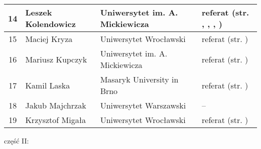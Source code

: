 \documentclass[12pt,oneside]{book}
\begin{document}
\begin{tabular}{||c|l|l|l||}
 14	 & Leszek Kolendowicz & Uniwersytet im. A. Mickiewicza & referat (str. \pageref{kendzierski}, \pageref{kolendowicz}, \pageref{taszarek}, \pageref{pilguj}) \\\hline
15 & Maciej Kryza & Uniwersytet Wrocławski & referat (str. \pageref{bilinska}) \\\hline
16 	& Mariusz Kupczyk & Uniwersytet im. A. Mickiewicza & referat (str. \pageref{kupczyk}) \\\hline
17    & Kamil Laska & Masaryk University in Brno & referat (str. \pageref{kendzierski}) \\\hline
18 	 & Jakub Majchrzak & Uniwersytet Warszawski & -- \\\hline	
19	 & Krzysztof Migała & Uniwersytet Wrocławski & referat (str. \pageref{pilguj}) \\\hline

	
\hline
\hline
\end{tabular}


\newpage

\vspace{1cm}

\Large część II:
\end{document}
